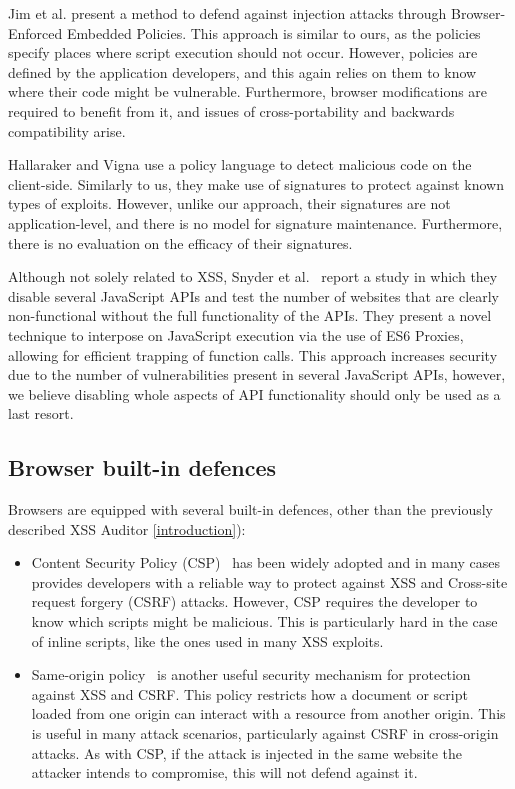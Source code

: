 Jim et al. \cite{Jim:2007:DSI:1242572.1242654} present a method to defend against injection attacks through Browser-Enforced Embedded Policies. This approach is similar to ours, as the policies specify places where script execution should not occur. However, policies are defined by the application developers, and this again relies on them to know where their code might be vulnerable. Furthermore, browser modifications are required to benefit from it, and issues of cross-portability and backwards compatibility arise.

Hallaraker and Vigna \cite{Hallaraker:2005:DMJ:1078029.1078861} use a policy language to detect malicious code on the client-side. Similarly to us, they make use of signatures to protect against known types of exploits. However, unlike our approach, their signatures are not application-level, and there is no model for signature maintenance. Furthermore, there is no evaluation on the efficacy of their signatures. 

Although not solely related to \ac{XSS}, Snyder et al.~\cite{Snyder:2017:MWD:3133956.3133966} report a study in which they disable several JavaScript APIs and test the number of websites that are clearly non-functional without the full functionality of the APIs. They present a novel technique to interpose on JavaScript execution via the use of ES6 Proxies, allowing for efficient trapping of function calls. This approach increases security due to the number of vulnerabilities present in several JavaScript APIs, however, we believe disabling whole aspects of API functionality should only be used as a last resort.

\subsection{Browser built-in defences}
Browsers are equipped with several built-in defences, other than the previously described XSS Auditor \ref{introduction}):
\begin{itemize}
	\item Content Security Policy (CSP)~\cite{CSP} has been widely adopted and in many cases provides developers with a reliable way to protect against \ac{XSS} and Cross-site request forgery (CSRF) attacks. However, CSP requires the developer to know which scripts might be malicious. This is particularly hard in the case of inline scripts, like the ones used in many \ac{XSS} exploits.
	\item Same-origin policy~\cite{SOP} is another useful security mechanism for protection against \ac{XSS} and CSRF. This policy restricts how a document or script loaded from one origin can interact with a resource from another origin. This is useful in many attack scenarios, particularly against CSRF in cross-origin attacks. As with CSP, if the attack is injected in the same website the attacker intends to compromise, this will not defend against it.
\end{itemize}

